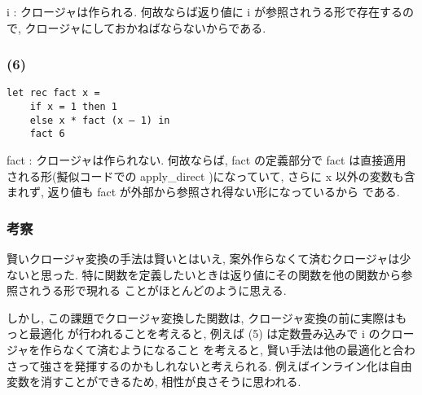 \documentclass[dvipdfmx]{jsarticle}
\begin{document}
  i :
  クロージャは作られる.
  何故ならば返り値に i が参照されうる形で存在するので, クロージャにしておかねばならないからである.

  \subsubsection*{(6)}
  \begin{lstlisting}[]
  let rec fact x =
    if x = 1 then 1
    else x * fact (x – 1) in
    fact 6
  \end{lstlisting}
  fact :
  クロージャは作られない. 何故ならば, fact の定義部分で fact は直接適用される形(擬似コードでの apply\_direct
  )になっていて, さらに x 以外の変数も含まれず, 返り値も fact が外部から参照され得ない形になっているから
  である.


\subsubsection*{考察}
賢いクロージャ変換の手法は賢いとはいえ, 案外作らなくて済むクロージャは少ないと思った.
特に関数を定義したいときは返り値にその関数を他の関数から参照されうる形で現れる
ことがほとんどのように思える.

しかし, この課題でクロージャ変換した関数は, クロージャ変換の前に実際はもっと最適化
が行われることを考えると, 例えば (5) は定数畳み込みで i のクロージャを作らなくて済むようになること
を考えると, 賢い手法は他の最適化と合わさって強さを発揮するのかもしれないと考えられる.
例えばインライン化は自由変数を消すことができるため, 相性が良さそうに思われる.
\end{document}

